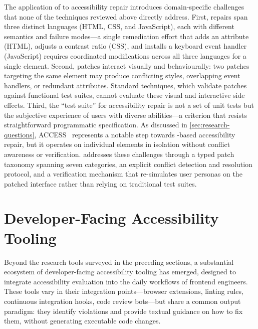 The application of  to  accessibility repair introduces domain-specific challenges that none of the techniques reviewed above directly address. First,  repairs span three distinct languages (HTML, CSS, and JavaScript), each with different semantics and failure modes---a single remediation effort that adds an  attribute (HTML), adjusts a contrast ratio (CSS), and installs a keyboard event handler (JavaScript) requires coordinated modifications across all three languages for a single element. Second,  patches interact visually and behaviourally: two patches targeting the same element may produce conflicting styles, overlapping event handlers, or redundant  attributes. Standard  techniques, which validate patches against functional test suites, cannot evaluate these visual and interactive side effects. Third, the ``test suite'' for accessibility repair is not a set of unit tests but the subjective experience of users with diverse abilities---a criterion that resists straightforward programmatic specification. As discussed in \cref{sec:research-questions}, ACCESS~\cite{access} represents a notable step towards -based accessibility repair, but it operates on individual elements in isolation without conflict awareness or verification. \versimux{} addresses these challenges through a typed patch taxonomy spanning seven categories, an explicit conflict detection and resolution protocol, and a verification mechanism that re-simulates user personas on the patched interface rather than relying on traditional test suites.


\section{Developer-Facing Accessibility Tooling}
\label{sec:bg-dev-tools}

Beyond the research tools surveyed in the preceding sections, a substantial ecosystem of developer-facing accessibility tooling has emerged, designed to integrate accessibility evaluation into the daily workflows of frontend engineers. These tools vary in their integration points---browser extensions, linting rules, continuous integration hooks, code review bots---but share a common output paradigm: they identify violations and provide textual guidance on how to fix them, without generating executable code changes.

